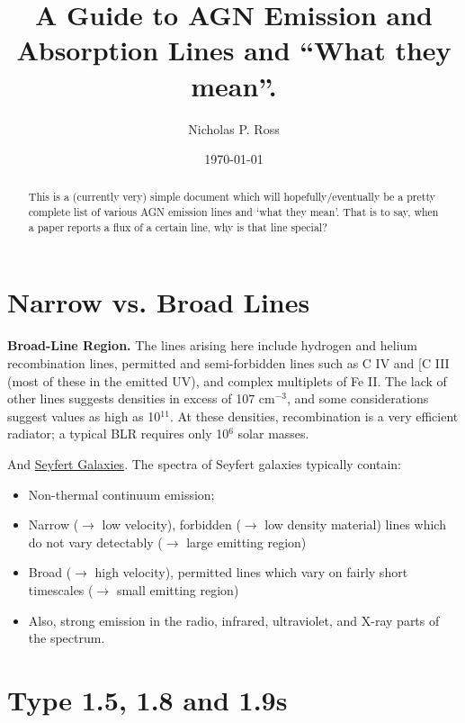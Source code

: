 \documentclass[11pt]{article}
\begin{document}
\title{A Guide to AGN Emission and Absorption Lines and ``What they mean''.}
\author{Nicholas P. Ross}
\date{\today}
\maketitle


\begin{abstract}
This is a (currently very) simple document which will
hopefully/eventually be a pretty complete list of various AGN emission
lines and `what they mean'. That is to say, when a paper reports a
flux of a certain line, why is that line special?
\end{abstract}



\section{Narrow vs. Broad Lines}
{\bf Broad-Line Region.} The lines arising here include hydrogen and helium recombination lines, permitted and semi-forbidden lines such as C IV and [C III (most of these in the emitted UV), and complex multiplets of Fe II. The lack of other lines suggests densities in excess of 10$7$ cm$^{-3}$, and some considerations suggest values as high as 10$^{11}$. At these densities, recombination is a very efficient radiator; a typical BLR requires only 10$^6$ solar masses.

And \href{http://abyss.uoregon.edu/~js/ast123/lectures/lec12.html}{Seyfert Galaxies}. 
The spectra of Seyfert galaxies typically contain:
\begin{itemize} 
  \item{Non-thermal continuum emission;}
  \item{Narrow ($\rightarrow$ low velocity), forbidden ($\rightarrow$ low density material) lines which do not vary detectably ($\rightarrow$ large emitting region)}
      \item{Broad ($\rightarrow$ high velocity), permitted lines which vary on fairly short timescales 
          ($\rightarrow$ small emitting region)}
    \item{ Also, strong emission in the radio, infrared, ultraviolet, and X-ray parts of the spectrum.}
\end{itemize} 

\section{Type 1.5, 1.8 and 1.9s}
\end{document}
